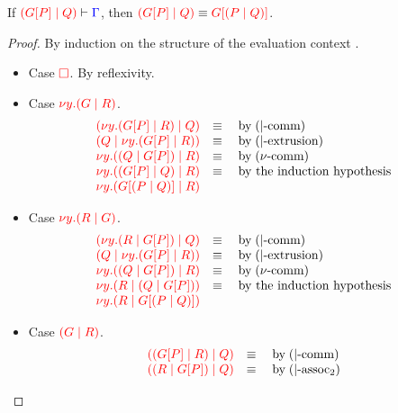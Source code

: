 \begin{lemma}\label{thm:nc-display-2}
  If $\seq[{ \ncPool{\cpPlug{G}{P}}{Q} }]{ \Gamma }$, then
  $\tm{\ncPool{\cpPlug{G}{P}}{Q}} \equiv \tm{\cpPlug{G}{\ncPool{P}{Q}}}$. 
\end{lemma}
\begin{proof}
  By induction on the structure of the evaluation context .
  \begin{itemize}
  \item
    Case $\tm{\Box}$. By reflexivity.
  \item
    Case $\tm{\cpCut{y}{G}{R}}$.
    \[\!
      \begin{array}{ll}
        \tm{\ncPool{\cpCut{y}{\cpPlug{G}{P}}{R}}{Q}} & \equiv \quad \text{by} \; \ncEquivPoolComm \\
        \tm{\ncPool{Q}{\cpCut{y}{\cpPlug{G}{P}}{R}}} & \equiv \quad \text{by} \; \ncRedKappaPool \\
        \tm{\cpCut{y}{\ncPool{Q}{\cpPlug{G}{P}}}{R}} & \equiv \quad \text{by} \; \cpEquivCutComm \\
        \tm{\cpCut{y}{\ncPool{\cpPlug{G}{P}}{Q}}{R}} & \equiv \quad \text{by the induction hypothesis}\\
        \tm{\cpCut{y}{\cpPlug{G}{\ncPool{P}{Q}}}{R}} &
      \end{array}
    \]
  \item
    Case $\tm{\cpCut{y}{R}{G}}$.
    \[\!
      \begin{array}{ll}
        \tm{\ncPool{\cpCut{y}{R}{\cpPlug{G}{P}}}{Q}} & \equiv \quad \text{by} \; \ncEquivPoolComm \\
        \tm{\ncPool{Q}{\cpCut{y}{\cpPlug{G}{P}}{R}}} & \equiv \quad \text{by} \; \ncRedKappaPool \\
        \tm{\cpCut{y}{\ncPool{Q}{\cpPlug{G}{P}}}{R}} & \equiv \quad \text{by} \; \cpEquivCutComm \\
        \tm{\cpCut{y}{R}{\ncPool{Q}{\cpPlug{G}{P}}}} & \equiv \quad \text{by the induction hypothesis} \\
        \tm{\cpCut{y}{R}{\cpPlug{G}{\ncPool{P}{Q}}}}
      \end{array}
    \]
  \item
    Case $\tm{\ncPool{G}{R}}$.
    \[\!
      \begin{array}{ll}
        \tm{\ncPool{\ncPool{\cpPlug{G}{P}}{R}}{Q}} & \equiv \quad \text{by} \; \ncEquivPoolComm \\
        \tm{\ncPool{\ncPool{R}{\cpPlug{G}{P}}}{Q}} & \equiv \quad \text{by} \; \ncEquivPoolAss2 \\

\end{array}\]
\end{itemize}
\end{proof}

